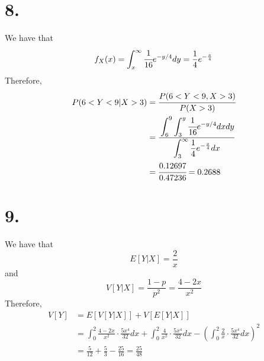 \documentclass[11pt]{article}
\begin{document}
\section*{8.}
We have that 
\[
    f_X(x) = \int_x^\infty \cfrac{1}{16}e^{-y/4} dy = \frac{1}{4}e^{-\frac{x}{4}}
\]
Therefore, 
\begin{equation*}
    \begin{aligned}    
        P(6<Y<9 | X>3) 
        &= \cfrac{P(6<Y<9, X>3)}{P(X>3)} \\
        &= \cfrac{\displaystyle\int_6^9 \int_3^y \cfrac{1}{16}e^{-y/4} dx dy}{\displaystyle\int_3^\infty \frac{1}{4}e^{-\frac{x}{4}} dx} \\
        &= \cfrac{0.12697}{0.47236} = 0.2688
    \end{aligned}
\end{equation*}
\pagebreak
\section*{9.}
We have that 
\[
    E[Y|X] = \frac{2}{x}    
\]
and 
\[
    V[Y|X] = \frac{1-p}{p^2} = \frac{4-2x}{x^2}   
\]
Therefore,
\begin{equation*}
    \begin{aligned}
        V[Y] 
        &= E[V[Y|X]] + V[E[Y|X]] \\
        &= \int_0^2 \frac{4-2x}{x^2} \cdot \frac{5x^4}{32} dx 
        + \int_0^2 \frac{4}{x^2} \cdot \frac{5x^4}{32} dx 
        - \left(\int_0^2 \frac{2}{x} \cdot \frac{5x^4}{32} dx \right)^2 \\
        &= \frac{5}{12} + \frac{5}{3} - \frac{25}{16} = \frac{25}{48} 
    \end{aligned}
\end{equation*}
    
\end{document}
